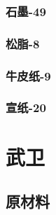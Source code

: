 \documentclass[12pt,a4paper,landscape]{article}
\begin{document}
\begin{CJK}{UTF8}{gbsn}
\subsubsection{石墨-49}
\subsubsection{松脂-8}
\subsubsection{牛皮纸-9}
\subsubsection{宣纸-20}


\section{武卫}

\subsection{原材料}
\subsubsection{}
\subsubsection{}
\subsubsection{}
\subsubsection{}
\subsubsection{}
\subsubsection{}
\subsubsection{}
\subsubsection{}
\subsubsection{}

\end{CJK}
\end{document}
